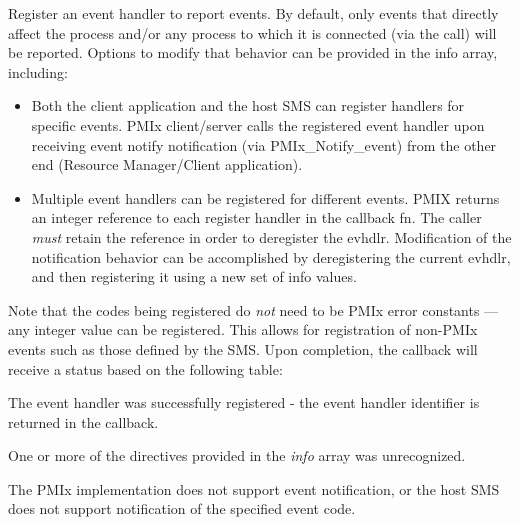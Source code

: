 \descr

Register an event handler to report events. By default, only events that directly affect the process and/or any process to which it is connected (via the  call) will be reported. Options to modify that behavior can be provided in the info array, including:

\begin{itemize}

\item Both the client application and the host \ac{SMS} can register handlers for specific events. \ac{PMIx} client/server calls the registered event handler upon receiving event notify notification (via PMIx_Notify_event) from the other end (Resource Manager/Client application).

\item Multiple event handlers can be registered for different events. PMIX returns an integer reference to each register handler in the callback fn. The caller \textit{must} retain the reference in order to deregister the evhdlr. Modification of the notification behavior can be accomplished by deregistering the current evhdlr, and then registering it using a new set of info values.
\end{itemize}

Note that the codes being registered do \textit{not} need to be \ac{PMIx} error constants --- any integer value can be registered. This allows for registration of non-PMIx events such as those defined by the \ac{SMS}. Upon completion, the callback will receive a status based on the following table:

\begin{constantdesc}
\item {} The event handler was successfully registered - the event handler identifier is returned in the callback.
\item {} One or more of the directives provided in the \textit{info} array was unrecognized.
\item {} The \ac{PMIx} implementation does not support event notification, or the host \ac{SMS} does not support notification of the specified event code.
\end{constantdesc}



\subsection{}

